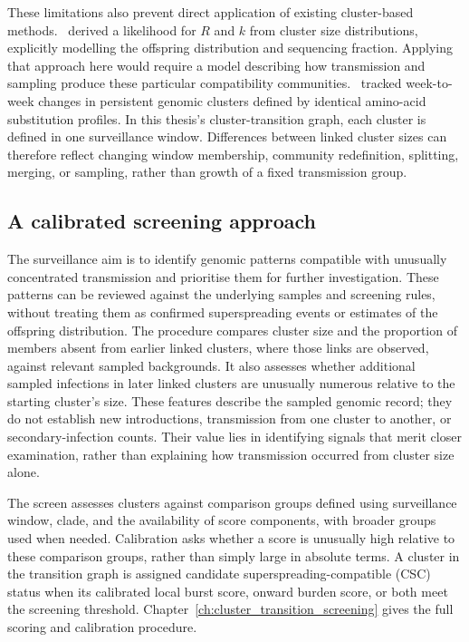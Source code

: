 These limitations also prevent direct application of existing cluster-based methods.\ \citet{TranKiem2024} derived a likelihood for $R$ and $k$ from cluster size distributions, explicitly modelling the offspring distribution and sequencing fraction. Applying that approach here would require a model describing how transmission and sampling produce these particular compatibility communities.\ \citet{dor2025} tracked week-to-week changes in persistent genomic clusters defined by identical amino-acid substitution profiles. In this thesis's cluster-transition graph, each cluster is defined in one surveillance window. Differences between linked cluster sizes can therefore reflect changing window membership, community redefinition, splitting, merging, or sampling, rather than growth of a fixed transmission group.

\subsection{A calibrated screening approach}\label{sec:ch2_screening_approach}

The surveillance aim is to identify genomic patterns compatible with unusually concentrated transmission and prioritise them for further investigation. These patterns can be reviewed against the underlying samples and screening rules, without treating them as confirmed superspreading events or estimates of the offspring distribution. The procedure compares cluster size and the proportion of members absent from earlier linked clusters, where those links are observed, against relevant sampled backgrounds. It also assesses whether additional sampled infections in later linked clusters are unusually numerous relative to the starting cluster's size. These features describe the sampled genomic record; they do not establish new introductions, transmission from one cluster to another, or secondary-infection counts. Their value lies in identifying signals that merit closer examination, rather than explaining how transmission occurred from cluster size alone.

The screen assesses clusters against comparison groups defined using surveillance window, clade, and the availability of score components, with broader groups used when needed. Calibration asks whether a score is unusually high relative to these comparison groups, rather than simply large in absolute terms. A cluster in the transition graph is assigned candidate superspreading-compatible (CSC) status when its calibrated local burst score, onward burden score, or both meet the screening threshold. Chapter~\ref{ch:cluster_transition_screening} gives the full scoring and calibration procedure.

